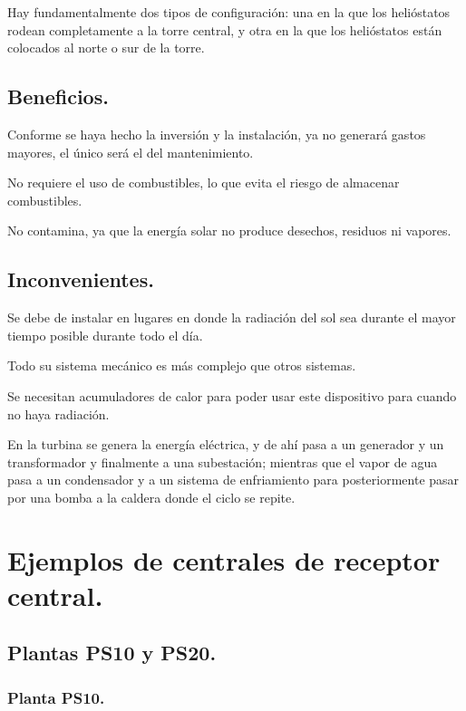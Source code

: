 Hay fundamentalmente dos tipos de configuración: una en la que los helióstatos rodean completamente a la torre central, y otra en la que los helióstatos están colocados al norte o sur de la torre.

\subsection{Beneficios.}

Conforme se haya hecho la inversión y la instalación, ya no generará gastos mayores, el único será el del mantenimiento.

No requiere el uso de combustibles, lo que evita el riesgo de almacenar combustibles.

No contamina, ya que la energía solar no produce desechos, residuos ni vapores.

\subsection{Inconvenientes.}

Se debe de instalar en lugares en donde la radiación del sol sea durante el mayor tiempo posible durante todo el día.

Todo su sistema mecánico es más complejo que otros sistemas.

Se necesitan acumuladores de calor para poder usar este dispositivo para cuando no haya radiación.

En la turbina se genera la energía eléctrica, y de ahí pasa a un generador y un transformador y finalmente a una subestación; mientras que el vapor de agua pasa a un condensador y a un sistema de enfriamiento para posteriormente pasar por una bomba a la caldera donde el ciclo se repite. \cite{IgualadaWebSite} \cite{SoliclimaWebSite} \cite{ClaudioWebSite}

\section{Ejemplos de centrales de receptor central.}

\subsection{Plantas PS10 y PS20.}

\subsubsection{Planta PS10.}

